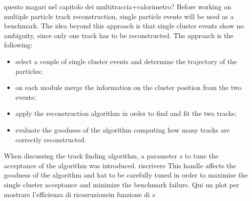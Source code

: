 {\color{red} questo magari nel capitolo dei multitraccia+calorimetro?}
Before working on multiple particle track reconstruction, single particle events
will be used as a benchmark. The idea beyond this approach is that single
cluster events show no ambiguity, since only one track has to be
reconstructed. The approach is the following:
\begin{itemize}
\item select a couple of single cluster events and determine the trajectory of the
  particles;
\item on each module merge the information on the cluster position from the
  two events;
\item apply the reconstruction algorithm in order to find and fit the two tracks;
\item evaluate the goodness of the algorithm computing how many tracks are
  correctly reconstructed.
\end{itemize}
When discussing the track finding algorithm, a parameter $s$ to tune
the acceptance of the algorithm was introduced. {\color{red} riscrivere This handle affects the goodness of the
algorithm and hat to be carefully tuned in order to maximise the single cluster
acceptance and minimize the benchmark failure.}
{\color{red} Qui un plot per mostrare l'efficienza di ricosruzionein funzione di $s$}


